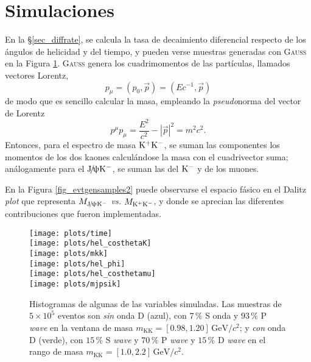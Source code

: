 \section{Simulaciones}

En la \S \ref{sec_diffrate}, se calcula la tasa de decaimiento diferencial respecto de los ángulos de helicidad y del tiempo, y pueden verse muestras generadas con \textsc{Gauss} en la Figura \ref{fig_evtgensamples1}. \textsc{Gauss} genera los cuadrimomentos de las partículas, llamados vectores Lorentz, 
\[p_{\mu} = (p_0, \vec{p}) = (Ec^{-1},\vec{p})\]
de modo que es sencillo calcular la masa, empleando la \emph{pseudo}norma del vector de Lorentz
\[p^{\mu}p_{\mu} = \frac{E^2}{c^2} - |\vec{p}|^2 = m^2c^2. \]
Entonces, para el espectro de masa $\text{K}{}^{+}\text{K}{}^{-}$, se suman las componentes los momentos de los dos kaones calculándose la masa con el cuadrivector suma; análogamente para el $\text{J}\!/\!\uppsi\text{K}{}^{-}$, se suman las del $\text{K}{}^{-}$ y de los muones.

En la Figura \ref{fig_evtgensamples2} puede observarse el espacio fásico en el Dalitz \textit{plot} que representa $M_{\text{J}\!/\!\uppsi\text{K}{}^{-}}$ \emph{vs.} $M_{\text{K}{}^{+}\text{K}{}^{-}}$, y donde se aprecian las diferentes contribuciones que fueron implementadas.




\begin{figure}[H]
\begin{flushright}
\begin{multicols}{2}
\texttt{[image: plots/time]} \\
\texttt{[image: plots/hel\_costhetaK]} \\
\texttt{[image: plots/mkk]} \\
\texttt{[image: plots/hel\_phi]} \\
\texttt{[image: plots/hel\_costhetamu]} \\
\texttt{[image: plots/mjpsik]}
\end{multicols}
\end{flushright}
\caption{Histogramas de algunas de las variables simuladas. Las muestras de $5\times10^5$ eventos  son \emph{sin} onda D (azul), con $7\,\%$ S onda y $93\,\%$ P \emph{wave} en la ventana de masa $m_{\text{KK}} = [0.98,1.20]\,\mathrm{GeV}/c^2$; y \emph{con} onda D (verde), con $15\,\%$ S \emph{wave} y $70\,\%$ P \emph{wave} y $15\,\%$ D \emph{wave} en el rango de masa $m_{\text{KK}} = [1.0,2.2]\,\mathrm{GeV}/c^2$.}   \label{fig_evtgensamples1}
\end{figure}





